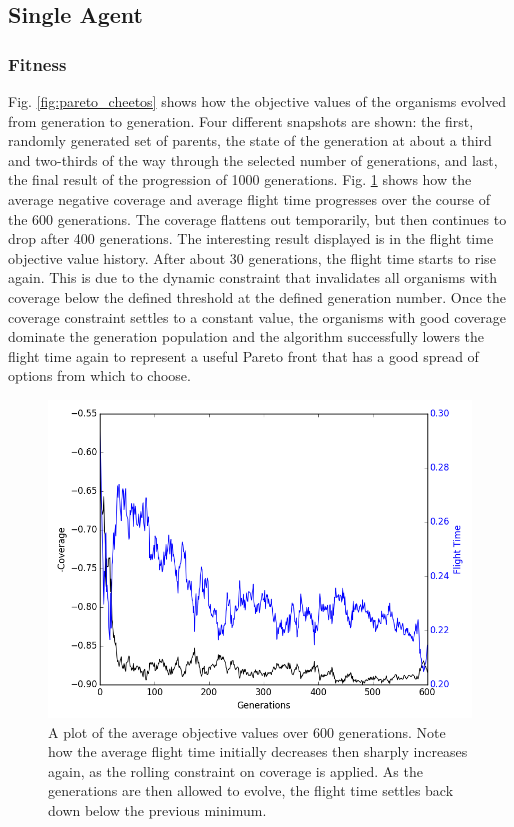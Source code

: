 \documentclass[letterpaper, 10 pt, conference]{ieeeconf}  %
\begin{document}
\subsection{Single Agent}
\subsubsection{Fitness}

Fig. \ref{fig:pareto_cheetos} shows how the objective values of the organisms evolved from generation to generation. Four different snapshots are shown: the first, randomly generated set of parents, the state of the generation at about a third and two-thirds of the way through the selected number of generations, and last, the final result of the progression of 1000 generations. Fig. \ref{fig:objectives} shows how the average negative coverage and average flight time progresses over the course of the 600 generations. The coverage flattens out temporarily, but then continues to drop after 400 generations. The interesting result displayed is in the flight time objective value history. After about 30 generations, the flight time starts to rise again. This is due to the dynamic constraint that invalidates all organisms with coverage below the defined threshold at the defined generation number. Once the coverage constraint settles to a constant value, the organisms with good coverage dominate the generation population and the algorithm successfully lowers the flight time again to represent a useful Pareto front that has a good spread of options from which to choose.

\begin{figure}
\centering
\includegraphics[width=1.0\linewidth]{figures/fitness.png}
\caption{A plot of the average objective values over 600 generations. Note how the average flight time initially decreases then sharply increases again, as the rolling constraint on coverage is applied. As the generations are then allowed to evolve, the flight time settles back down below the previous minimum.}
\label{fig:objectives}
\end{figure}
\end{document}
